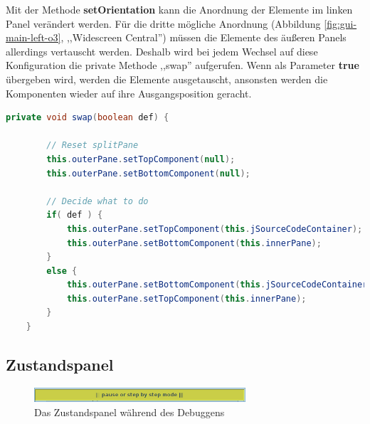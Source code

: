 Mit der Methode \textbf{setOrientation} kann die Anordnung der Elemente im linken Panel verändert werden. Für die dritte mögliche Anordnung (Abbildung \ref{fig:gui-main-left-o3}, ,,Widescreen Central'') müssen die Elemente des äußeren Panels allerdings vertauscht werden. Deshalb wird bei jedem Wechsel auf diese Konfiguration die private Methode ,,swap'' aufgerufen. Wenn als Parameter \textbf{true} übergeben wird, werden die Elemente ausgetauscht, ansonsten werden die Komponenten wieder auf ihre Ausgangsposition geracht.

\begin{lstlisting}[language=JAVA]
	private void swap(boolean def) {
		
		// Reset splitPane
		this.outerPane.setTopComponent(null);
		this.outerPane.setBottomComponent(null);
		
		// Decide what to do
		if( def ) {
			this.outerPane.setTopComponent(this.jSourceCodeContainer);
			this.outerPane.setBottomComponent(this.innerPane);
		}
		else {
			this.outerPane.setBottomComponent(this.jSourceCodeContainer);
			this.outerPane.setTopComponent(this.innerPane);
		}
	}
\end{lstlisting}

\subsection{Zustandspanel}
\label{sec:gui-main-left-zust}

\begin{figure}[htbp] 
  \centering
     \includegraphics[width=0.7\textwidth]{./media/images/gui/main/CCompact-gui-left-panel.png}
  \caption{Das Zustandspanel während des Debuggens}
  \label{fig:gui-main-left-panel}
\end{figure}

